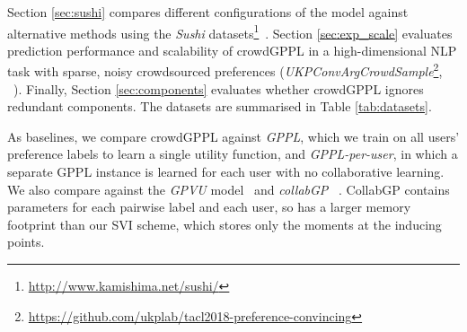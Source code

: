Section \ref{sec:sushi}
compares different configurations of the model
against alternative methods
using the \emph{Sushi} datasets\footnote{\url{http://www.kamishima.net/sushi/}}~\citep{kamishima2003nantonac}.
Section \ref{sec:exp_scale} evaluates prediction performance and scalability of
 crowdGPPL %
in a high-dimensional
NLP task
with sparse, noisy crowdsourced preferences
(\emph{UKPConvArgCrowdSample}\footnote{\url{https://github.com/ukplab/tacl2018-preference-convincing}}, ~\citet{simpson2018finding}).
Finally, Section \ref{sec:components} evaluates whether crowdGPPL ignores redundant
components.
The datasets are summarised in Table \ref{tab:datasets}.




As baselines, we compare crowdGPPL against 
\emph{GPPL},
which we train on all users' preference labels to learn a single utility function,
and \emph{GPPL-per-user},
in which a separate GPPL instance is learned for each user with no collaborative
learning.
We also compare against the \emph{GPVU} model~\citep{khan2014scalable} 
and 
\emph{collabGP} ~\citep{houlsby2012collaborative}.
CollabGP contains parameters for each pairwise label and
 each user, so has a larger memory footprint than our SVI scheme, 
which stores only the moments at the inducing points.

